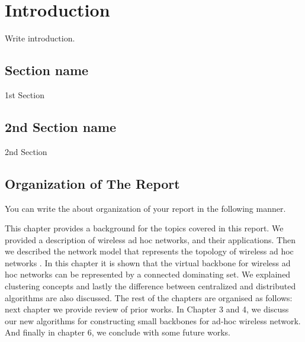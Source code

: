\chapter{Introduction}
\hspace{3mm}

Write introduction.

\section{Section name}
1st Section

\section{2nd Section name}

2nd Section

\section{Organization of The Report}

You can write the about organization of your report in the following manner.

This chapter provides a background for the topics covered in this
report. We provided a description of wireless ad hoc networks, and
their applications. Then we described the network model that
represents the topology of wireless ad hoc networks \cite{Omar2016}. In this
chapter it is shown that the virtual backbone for wireless ad hoc
networks can be represented by a connected dominating set. We
explained clustering concepts and lastly the difference between
centralized and distributed algorithms are also discussed. The
rest of the chapters are organised as follows: next chapter we
provide review of prior works. In Chapter 3 and 4, we discuss our
new algorithms for constructing small backbones for ad-hoc
wireless network. And finally in chapter 6, we conclude with some
future works.


